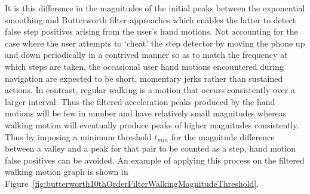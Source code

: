\documentclass[12pt,a4paper,notitlepage]{report}
\begin{document}
It is this difference in the magnitudes of the initial peaks between the exponential smoothing and Butterworth filter approaches which enables the latter to detect false step positives arising from the user's hand motions. Not accounting for the case where the user attempts to `cheat' the step detector by moving the phone up and down periodically in a contrived manner so as to match the frequency at which steps are taken, the occasional user hand motions encountered during navigation are expected to be short, momentary jerks rather than sustained actions. In contrast, regular walking is a motion that occurs consistently over a larger interval. Thus the filtered acceleration peaks produced by the hand motions will be few in number and have relatively small magnitudes whereas walking motion will eventually produce peaks of higher magnitudes consistently. Thus by imposing a minimum threshold $t_{min}$ for the magnitude difference between a valley and a peak for that pair to be counted as a step, hand motion false positives can be avoided. An example of applying this process on the filtered walking motion graph is shown in Figure~\ref{fig:butterworth10thOrderFilterWalkingMagnitudeThreshold}. 
\end{document}
